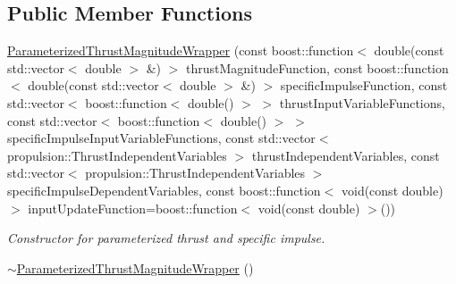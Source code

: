 \subsection*{Public Member Functions}
\begin{DoxyCompactItemize}
\item 
\hyperlink{classtudat_1_1propulsion_1_1ParameterizedThrustMagnitudeWrapper_a4a26ca8a090f901aabef7ac07aead115}{Parameterized\+Thrust\+Magnitude\+Wrapper} (const boost\+::function$<$ double(const std\+::vector$<$ double $>$ \&) $>$ thrust\+Magnitude\+Function, const boost\+::function$<$ double(const std\+::vector$<$ double $>$ \&) $>$ specific\+Impulse\+Function, const std\+::vector$<$ boost\+::function$<$ double() $>$ $>$ thrust\+Input\+Variable\+Functions, const std\+::vector$<$ boost\+::function$<$ double() $>$ $>$ specific\+Impulse\+Input\+Variable\+Functions, const std\+::vector$<$ propulsion\+::\+Thrust\+Independent\+Variables $>$ thrust\+Independent\+Variables, const std\+::vector$<$ propulsion\+::\+Thrust\+Independent\+Variables $>$ specific\+Impulse\+Dependent\+Variables, const boost\+::function$<$ void(const double) $>$ input\+Update\+Function=boost\+::function$<$ void(const double) $>$())
\begin{DoxyCompactList}\small\item\em Constructor for parameterized thrust and specific impulse. \end{DoxyCompactList}\item 
\hyperlink{classtudat_1_1propulsion_1_1ParameterizedThrustMagnitudeWrapper_a578598427e7002773a448a398b822f0d}{$\sim$\+Parameterized\+Thrust\+Magnitude\+Wrapper} ()\hypertarget{classtudat_1_1propulsion_1_1ParameterizedThrustMagnitudeWrapper_a578598427e7002773a448a398b822f0d}{}\label{classtudat_1_1propulsion_1_1ParameterizedThrustMagnitudeWrapper_a578598427e7002773a448a398b822f0d}


\end{DoxyCompactItemize}
